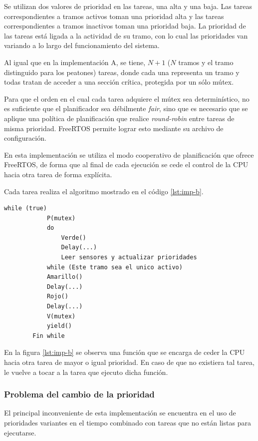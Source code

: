 	Se utilizan dos valores de prioridad en las tareas, una alta y una baja.
	Las tareas correspondientes a tramos activos toman una prioridad alta y las tareas correspondientes a tramos inactivos toman una prioridad baja. 
	La prioridad de las tareas está ligada a la actividad de su tramo, con lo cual las prioridades van variando a lo largo del funcionamiento del sistema.

	Al igual que en la implementación A, se tiene, $N + 1$ ($N$ tramos y el tramo distinguido para los peatones) tareas, donde cada una representa un tramo y todas tratan de acceder a una sección crítica, protegida por un sólo mútex.

	Para que el orden en el cual cada tarea adquiere el mútex sea determinístico, no es suficiente que el planificador sea débilmente \emph{fair}, sino que es necesario que se aplique una política de planificación que realice \emph{round-robin} entre tareas de misma prioridad.
	FreeRTOS permite lograr esto mediante su archivo de configuración.

	En esta implementación se utiliza el modo cooperativo de planificación que ofrece FreeRTOS, de forma que al final de cada ejecución se cede el control de la CPU hacia otra tarea de forma explícita.

	Cada tarea realiza el algoritmo mostrado en el código \ref{lst:imp-b}.

	\begin{lstlisting}[float, label=lst:imp-b, caption=Pseudocódigo del programa que corre cada tarea en la implementación B.]
		while (true)
			P(mutex)
			do
				Verde()
				Delay(...)
				Leer sensores y actualizar prioridades
			while (Este tramo sea el unico activo)
			Amarillo()
			Delay(...)
			Rojo()
			Delay(...)
			V(mutex)
			yield()
		Fin while
	\end{lstlisting}

	En la figura \ref{lst:imp-b} se observa una función  que se encarga de ceder la CPU hacia otra tarea de mayor o igual prioridad.
	En caso de que no existiera tal tarea, le vuelve a tocar a la tarea que ejecuto dicha función.

	\subsubsection{Problema del cambio de la prioridad}
	El principal inconveniente de esta implementación se encuentra en el uso de prioridades variantes en el tiempo combinado con tareas que no están listas para ejecutarse.

